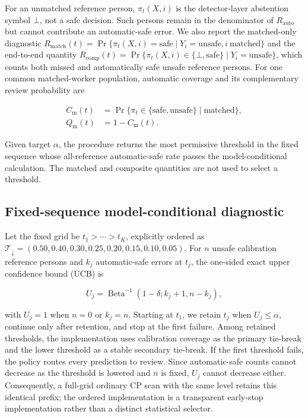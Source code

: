 \documentclass[iicol,pdflatex,sn-mathphys-num]{sn-jnl}
\begin{document}
For an unmatched reference person, $\pi_t(X,i)$ is the detector-layer abstention symbol $\bot$, not a safe decision. Such persons remain in the denominator of $R_{\mathrm{auto}}$ but cannot contribute an automatic-safe error. We also report the matched-only diagnostic $R_{\mathrm{match}}(t)=\Pr\{\pi_t(X,i)=\mathrm{safe}\mid Y_i=\mathrm{unsafe},i\ \mathrm{matched}\}$ and the end-to-end quantity $R_{\mathrm{comp}}(t)=\Pr\{\pi_t(X,i)\in\{\bot,\mathrm{safe}\}\mid Y_i=\mathrm{unsafe}\}$, which counts both missed and automatically safe unsafe reference persons. For one common matched-worker population, automatic coverage and its complementary review probability are

\begin{equation}
\begin{aligned}
C_{\mathrm{m}}(t)&=\Pr\{\pi_t\in\{\mathrm{safe},\mathrm{unsafe}\}\mid \mathrm{matched}\},\\
Q_{\mathrm{m}}(t)&=1-C_{\mathrm{m}}(t).
\end{aligned}
\end{equation}

Given target $\alpha$, the procedure returns the most permissive threshold in the fixed sequence whose all-reference automatic-safe rate passes the model-conditional calculation. The matched and composite quantities are not used to select a threshold.

\subsection{Fixed-sequence model-conditional diagnostic}

Let the fixed grid be $t_1>\cdots>t_K$, explicitly ordered as $\mathcal{T}_{\downarrow}=(0.50,0.40,0.30,0.25,0.20,0.15,0.10,0.05)$. For $n$ unsafe calibration reference persons and $k_j$ automatic-safe errors at $t_j$, the one-sided exact upper confidence bound (UCB) is

\begin{equation}
U_j=\operatorname{Beta}^{-1}(1-\delta;k_j+1,n-k_j),
\label{eq:cp}
\end{equation}

with $U_j=1$ when $n=0$ or $k_j=n$. Starting at $t_1$, we retain $t_j$ when $U_j\leq\alpha$, continue only after retention, and stop at the first failure. Among retained thresholds, the implementation uses calibration coverage as the primary tie-break and the lower threshold as a stable secondary tie-break. If the first threshold fails, the policy routes every prediction to review. Since automatic-safe counts cannot decrease as the threshold is lowered and $n$ is fixed, $U_j$ cannot decrease either. Consequently, a full-grid ordinary CP scan with the same level retains this identical prefix; the ordered implementation is a transparent early-stop implementation rather than a distinct statistical selector.
\end{document}
